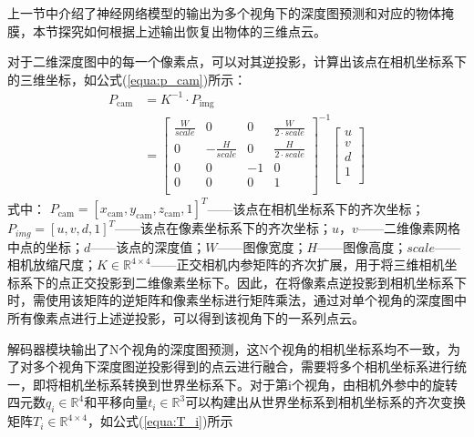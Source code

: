 上一节中介绍了神经网络模型的输出为多个视角下的深度图预测和对应的物体掩膜，本节探究如何根据上述输出恢复出物体的三维点云。

对于二维深度图中的每一个像素点，可以对其逆投影，计算出该点在相机坐标系下的三维坐标，如公式(\ref{equa:p_cam})所示：
\begin{equation}
    \label{equa:p_cam}
    \begin{aligned}
        P_{\text{cam}} &= K^{-1} \cdot P_{\text{img}} \\
                &= {\begin{bmatrix}
                    \frac{W}{scale} & 0 & 0 & \frac{W}{2\cdot scale} \\
                    0 & -\frac{H}{scale} & 0 & \frac{H}{2\cdot scale} \\
                    0 & 0 & -1 & 0 \\
                    0 & 0 & 0 & 1\\
                 \end{bmatrix}}^{-1}
                    \begin{bmatrix}
                        u \\
                        v \\
                        d \\
                        1 \\
                    \end{bmatrix}
    \end{aligned}
\end{equation}
式中： $P_{\text{cam}} = \left[x_\text{cam},y_\text{cam},z_\text{cam},1\right]^T$——该点在相机坐标系下的齐次坐标；$P_{img} = [u,v,d,1]^T$——该点在像素坐标系下的齐次坐标；$u$，$v$——二维像素网格中点的坐标；$d$——该点的深度值；$W$——图像宽度；$H$——图像高度；$scale$——相机放缩尺度；$K\in \mathbb{R}^{4\times 4}$——正交相机内参矩阵的齐次扩展，用于将三维相机坐标系下的点正交投影到二维像素坐标下。因此，在将像素点逆投影到相机坐标系下时，需使用该矩阵的逆矩阵和像素坐标进行矩阵乘法，通过对单个视角的深度图中所有像素点进行上述逆投影，可以得到该视角下的一系列点云。

解码器模块输出了N个视角的深度图预测，这N个视角的相机坐标系均不一致，为了对多个视角下深度图逆投影得到的点云进行融合，需要将多个相机坐标系进行统一，即将相机坐标系转换到世界坐标系下。对于第i个视角，由相机外参中的旋转四元数${q_i}\in\mathbb{R}^{4}$和平移向量${t_i}\in \mathbb{R}^{3}$可以构建出从世界坐标系到相机坐标系的齐次变换矩阵${T_i}\in \mathbb{R}^{4\times 4}$，如公式(\ref{equa:T_i})所示

